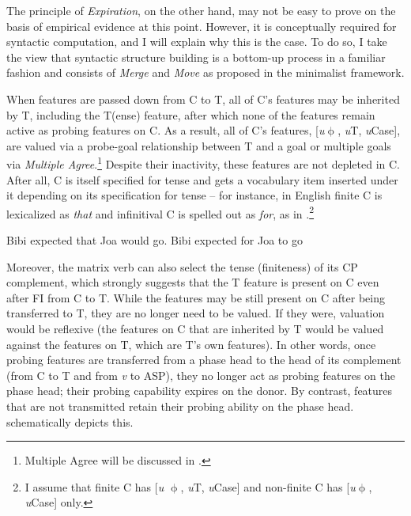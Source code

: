 The principle of \textit{Expiration}, on the other hand, may not be easy to prove on the basis of empirical evidence at this point. However, it is conceptually required for syntactic computation, and I will explain why this is the case. To do so, I take the view that syntactic structure building is a bottom-up process in a familiar fashion and consists of \textit{Merge} and \textit{Move} as proposed in the minimalist framework. 

When features are passed down from C to T, all of C’s features may be inherited by T, including the T(ense) feature, after which none of the features remain active as probing features on C. As a result, all of C’s features, [\textit{u}$\upphi$, \textit{u}T, \textit{u}Case], are valued via a probe-goal relationship between T and a goal or multiple goals via \textit{Multiple Agree}.\footnote{Multiple Agree will be discussed in .} Despite their inactivity, these features are not depleted in C. After all, C is itself specified for tense and gets a vocabulary item inserted under it depending on its specification for tense -- for instance, in English finite C is lexicalized as \textit{that} and infinitival C is spelled out as \textit{for}, as in .\footnote{I assume that finite C has [\textit{u} $\upphi$, \textit{u}T, \textit{u}Case] and non-finite C has [\textit{u}$\upphi$, \textit{u}Case] only.}

\ea\label{ex:76}
    \ea Bibi expected that Joa would go.
    \ex Bibi expected for Joa to go
    \z
\z

Moreover, the matrix verb can also select the tense (finiteness) of its \ac{CP} complement, which strongly suggests that the T feature is present on C even after \ac{FI} from C to T. While the features may be still present on C after being transferred to T, they are no longer need to be valued. If they were, valuation would be reflexive (the features on C that are inherited by T would be valued against the features on T, which are T’s own features). In other words, once probing features are transferred from a phase head to the head of its complement (from C to T and from \textit{v} to \ac{ASP}), they no longer act as probing features on the phase head; their probing capability expires on the donor. By contrast, features that are not transmitted retain their probing ability on the phase head.  schematically depicts this.

\newpage


